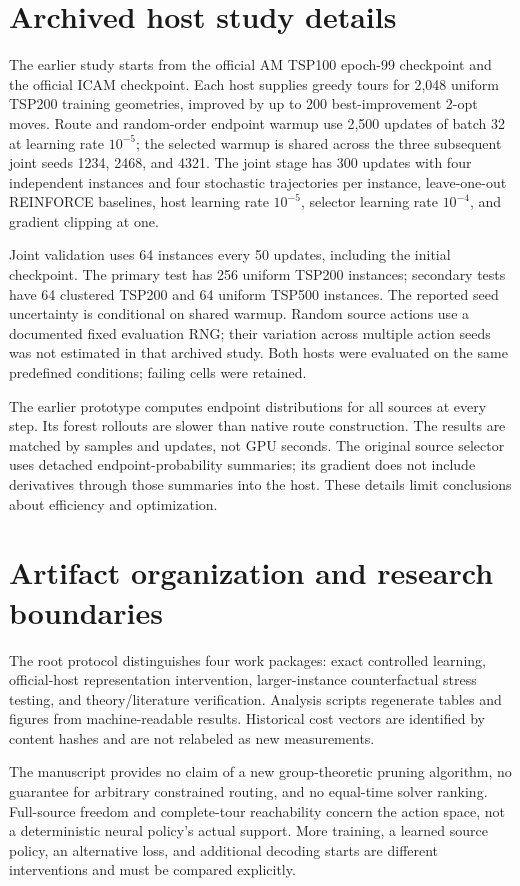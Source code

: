 \section{Archived host study details}
The earlier study starts from the official AM TSP100 epoch-99 checkpoint and
the official ICAM checkpoint. Each host supplies greedy tours for 2,048
uniform TSP200 training geometries, improved by up to 200 best-improvement
2-opt moves. Route and random-order endpoint warmup use 2,500 updates of
batch 32 at learning rate $10^{-5}$; the selected warmup is shared across
the three subsequent joint seeds 1234, 2468, and 4321. The joint stage has
300 updates with four independent instances and four stochastic trajectories
per instance, leave-one-out REINFORCE baselines, host learning rate $10^{-5}$,
selector learning rate $10^{-4}$, and gradient clipping at one.

Joint validation uses 64 instances every 50 updates, including the initial
checkpoint. The primary test has 256 uniform TSP200 instances; secondary
tests have 64 clustered TSP200 and 64 uniform TSP500 instances. The reported
seed uncertainty is conditional on shared warmup. Random source actions use
a documented fixed evaluation RNG; their variation across multiple action
seeds was not estimated in that archived study. Both hosts were evaluated
on the same predefined conditions; failing cells were retained.

The earlier prototype computes endpoint distributions for all sources at
every step. Its forest rollouts are slower than native route construction.
The results are matched by samples and updates, not GPU seconds. The original
source selector uses detached endpoint-probability summaries; its gradient
does not include derivatives through those summaries into the host. These
details limit conclusions about efficiency and optimization.

\section{Artifact organization and research boundaries}
The root protocol distinguishes four work packages: exact controlled learning,
official-host representation intervention, larger-instance counterfactual
stress testing, and theory/literature verification. Analysis scripts regenerate
tables and figures from machine-readable results. Historical cost vectors are
identified by content hashes and are not relabeled as new measurements.

The manuscript provides no claim of a new group-theoretic pruning algorithm,
no guarantee for arbitrary constrained routing, and no equal-time solver
ranking. Full-source freedom and complete-tour reachability concern the
action space, not a deterministic neural policy's actual support. More
training, a learned source policy, an alternative loss, and additional
decoding starts are different interventions and must be compared explicitly.
